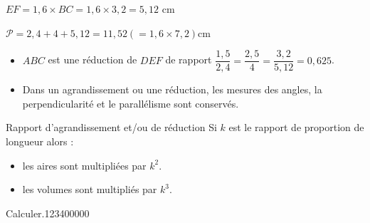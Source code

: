 \begin{pageCours}
\begin{ExCor}
\begin{minipage}{0.48\linewidth}
$EF = 1,6 \times BC = 1,6 \times 3,2 = 5,12$ cm

$\mathcal{P} = 2,4 + 4 + 5,12 = 11,52 (= 1,6 \times 7,2) $cm
\end{minipage}

\end{ExCor}

\begin{Rq} 
\begin{itemize}
\item $ABC$ est une réduction de $DEF$ de rapport $\dfrac{1,5}{2,4}  = \dfrac{2,5}{4} =\dfrac{3,2}{5,12}  = 0,625$.
\item Dans un agrandissement ou une réduction, les mesures des angles, la perpendicularité 
et le parallélisme sont conservés.
\end{itemize}
\end{Rq}



\begin{ThT}{Rapport d'agrandissement et/ou de réduction}
Si $k$ est le rapport de proportion de longueur alors :
\begin{itemize}[leftmargin=*]
\item  les aires sont multipliées par $k^2$.
\item  les volumes sont multipliés par $k^3$.
\end{itemize}
\end{ThT}




\end{pageCours} 
\begin{pageAD} 
 


\begin{ExoCad}{Calculer.}{1234}{0}{0}{0}{0}{0}

 

\end{ExoCad}



\end{pageAD}
